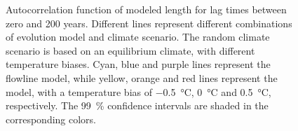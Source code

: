 \begin{figure}[htp]
        \caption{Autocorrelation function of modeled length for lag times between zero and 200 years. Different lines represent different combinations of evolution model and climate scenario.
        The random climate scenario is based on an equilibrium climate, with different temperature biases.
        Cyan, blue and purple lines represent the flowline model, while yellow, orange and red lines represent the \vas{} model, with a temperature bias of \SI{-.5}{\celsius}, \SI{0}{\celsius} and \SI{+.5}{\celsius}, respectively.
        The \SI{99}{\percent} confidence intervals are shaded in the corresponding colors.}
        \label{fig:acf}
      \end{figure}

      \begin{figure}[htp]
        \centering
        

\end{figure}
